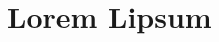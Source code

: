\documentclass[10pt,a4paper]{scrartcl}
\begin{document}
\section{Lorem Lipsum}
\lipsum[1-7]
\end{document}
